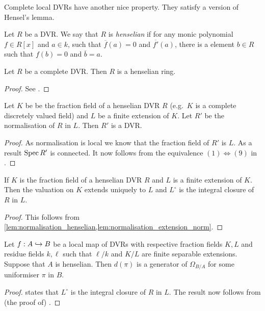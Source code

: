Complete local DVRs have another nice property. They satisfy a version of Hensel's lemma. 
\begin{definition}\label{def:henselian}
	Let $R$ be a DVR. 
	We say that $R$ is \emph{henselian} if for any monic polynomial $f \in R[x]$ and  $a \in k$, such that $\overline{f}(a) = 0$ and $\overline{f'}(a)$, there is a element $b \in R$ such that $f(b) = 0$ and $\overline{b} = a$.
\end{definition}
\begin{lemma}
	Let $R$ be a complete DVR. 
	Then $R$ is a henselian ring.
\end{lemma}
\begin{proof}
	See .
\end{proof}


\begin{lemma}\label{lem:normalisation_henselian}
	Let $K$ be be the fraction field of a henselian DVR $R$ (e.g.\ $K$ is a complete discretely valued field) and $L$ be a finite extension of $K$.	
	Let $R'$ be the normalisation of $R$ in $L$. 
	Then $R'$ is a DVR.
\end{lemma}
\begin{proof}
	As normalisation is local we know that the fraction field of $R'$ is $L$. 
	As a result $\operatorname{Spec} R'$ is connected. 
	It now follows from the equivalence $(1) \iff (9)$ in .
\end{proof}
\begin{corollary}\label{cor:normalisation_henselian}
	If $K$ is the fraction field of a henselian DVR $R$ and $L$ is a finite extension of $K$. 
	Then the valuation on $K$ extends uniquely to $L$ and $L^{\circ}$ is the integral closure of $R$ in $L$.  
\end{corollary}
\begin{proof}
	This follows from \cref{lem:normalisation_henselian,lem:normalisation_extension_norm}. 
\end{proof}
\begin{lemma}\label{lem:generator_canonical_bundle_DVR}
	Let $f: A \hookrightarrow B$ be a local map of DVRs with respective fraction fields $K, L$ and residue fields $k, \ell$ such that $\ell / k$ and $K / L$ are finite separable extensions. 
	Suppose that $A$ is henselian. 
	Then $d(\pi)$ is a generator of $\Omega_{B / A}$ for some uniformiser $\pi$ in $B$. 
\end{lemma}
\begin{proof}
	 states that $L^{\circ}$ is the integral closure of $R$ in $L$. 
	The result now follows from (the proof of) \cite[\S III.7, prop.\ 14]{serreCorpsLocaux1980}.
\end{proof}





